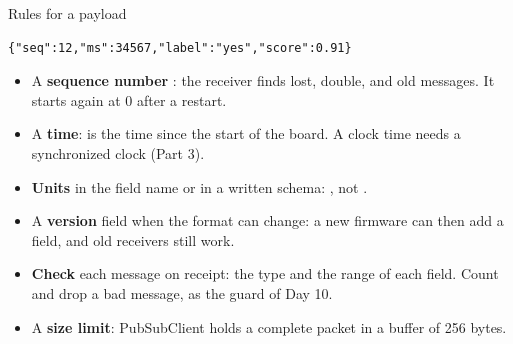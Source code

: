 \begin{frame}[fragile]{Rules for a payload}
\begin{lstlisting}[style=python]
{"seq":12,"ms":34567,"label":"yes","score":0.91}
\end{lstlisting}
  \small
  \begin{itemize}
    \item A \textbf{sequence number} : the receiver finds lost,
          double, and old messages. It starts again at 0 after a restart.
    \item A \textbf{time}:  is the time since the start of the
          board. A clock time needs a synchronized clock (Part 3).
    \item \textbf{Units} in the field name or in a written schema:
          , not .
    \item A \textbf{version} field when the format can change: a new
          firmware can then add a field, and old receivers still work.
    \item \textbf{Check} each message on receipt: the type and the range of
          each field. Count and drop a bad message, as the guard of
          Day 10.
    \item A \textbf{size limit}: PubSubClient holds a complete packet in a
          buffer of 256 bytes.
  \end{itemize}
\end{frame}

